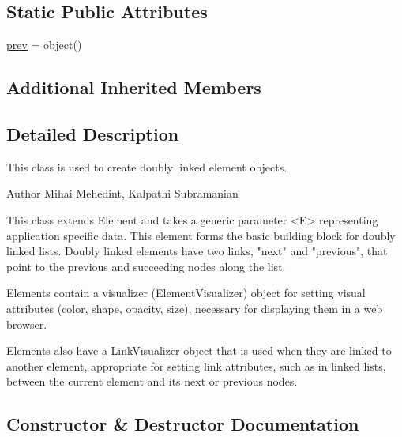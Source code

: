 \subsection*{Static Public Attributes}
\begin{DoxyCompactItemize}
\item 
\mbox{\hyperlink{classbridges_1_1dl__element_1_1_d_lelement_a90ac125877c6733ee7f0181ce19e02df}{prev}} = object()
\end{DoxyCompactItemize}
\subsection*{Additional Inherited Members}


\subsection{Detailed Description}
This class is used to create doubly linked element objects. 

\begin{DoxyAuthor}{Author}
Mihai Mehedint, Kalpathi Subramanian
\end{DoxyAuthor}
\begin{DoxyVerb}This class extends Element and takes a generic parameter <E> representing
application specific data. This element forms the basic building block for
doubly linked lists. Doubly linked elements have two links,
"next" and "previous", that point to the previous and succeeding nodes along the list.

Elements contain a visualizer (ElementVisualizer) object for setting visual
attributes (color, shape, opacity, size), necessary for displaying them in a web
browser.

Elements also have a LinkVisualizer object that is used when they are linked to
another element, appropriate for setting link attributes, such as in linked lists,
between the current element and its next or previous nodes.\end{DoxyVerb}
 

\subsection{Constructor \& Destructor Documentation}
\mbox{\label{classbridges_1_1dl__element_1_1_d_lelement_a4c78a2c1aebf91783fb73e3909b1267f}} 
